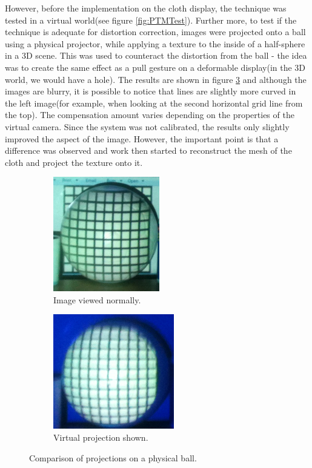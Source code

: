 \documentclass[]{article}
\begin{document}
However, before the implementation on the cloth display, the technique was tested in a virtual world(see figure \ref{fig:PTMTest}). Further more, to test if the technique is adequate for distortion correction, images were projected onto a ball using a physical projector, while applying a texture to the inside of a half-sphere in a 3D scene. This was used to counteract the distortion from the ball - the idea was to create the same effect as a pull gesture on a deformable display(in the 3D world, we would have a hole). The results are shown in figure \ref{fig:BallProjection} and although the images are blurry, it is possible to notice that lines are slightly more curved in the left image(for example, when looking at the second horizontal grid line from the top). The compensation amount varies depending on the properties of the virtual camera. Since the system was not calibrated, the results only slightly improved the aspect of the image. However, the important point is that a difference was observed and work then started to reconstruct the mesh of the cloth and project the texture onto it.


\begin{figure}
\centering
\begin{subfigure}{.5\textwidth}
  \centering
  \includegraphics[width=0.9\linewidth, height=5cm]{figures/BallUncompensated.jpg}
  \caption{Image viewed normally.}
  \label{fig:BallNotCompensated}
\end{subfigure}%
\begin{subfigure}{.5\textwidth}
  \centering
  \includegraphics[width=0.9\linewidth, height=5cm]{figures/BallCompensated.png}
  \caption{Virtual projection shown.}
  \label{fig:BallCompensated}
\end{subfigure}
\caption{Comparison of projections on a physical ball.}
\label{fig:BallProjection}
\end{figure}
\end{document}
